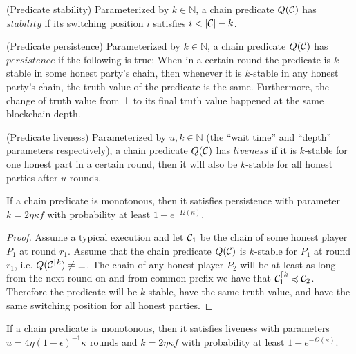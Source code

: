 \documentclass[11pt]{llncs}
\begin{document}
\begin{definition}{(Predicate stability)}
    Parameterized by $k \in \mathbb{N}$, a chain predicate $Q(\mathcal{C})$ has
    $\textit{stability}$ if its switching position $i$ satisfies $i < |\mathcal{C}|
    - k$.
\end{definition}

\begin{definition}{(Predicate persistence)}
    Parameterized by $k \in \mathbb{N}$, a chain predicate $Q(\mathcal{C})$ has
    $\textit{persistence}$ if the following is true: When in a certain round
    the predicate is $k$-stable in some honest party's chain, then whenever it is
    $k$-stable in any honest party's chain, the truth value of the predicate is
    the same. Furthermore, the change of truth value from $\bot$ to its final
    truth value happened at the same blockchain depth.
\end{definition}

\begin{definition}{(Predicate liveness)}
    Parameterized by $u, k \in \mathbb{N}$ (the ``wait time'' and ``depth''
    parameters respectively), a chain predicate $Q(\mathcal{C})$ has
    $\textit{liveness}$ if it is $k$-stable for one honest part in a certain
    round, then it will also be $k$-stable for all honest parties after $u$ rounds.
\end{definition}

\begin{theorem}
    If a chain predicate is monotonous, then it satisfies persistence with
    parameter $k = 2\eta \kappa f$ with probability at least $1 -
    e^{-\Omega(\kappa)}$.
\end{theorem}

\begin{proof}
    Assume a typical execution and let $\mathcal{C}_1$ be the chain of some honest
    player $P_1$ at round $r_1$. Assume that the chain predicate $Q(\mathcal{C})$ is
    $k$-stable for $P_1$ at round $r_1$, i.e.  $Q(\mathcal{C}^{\lceil k}) \neq \bot$.
    The chain of any honest player $P_2$ will be at least as long from the next
    round on and from common prefix we have that $\mathcal{C}_1^{\lceil k}
    \preccurlyeq \mathcal{C}_2$. Therefore the predicate will be $k$-stable, have
    the same truth value, and have the same switching position for all honest
    parties.
\end{proof}

\begin{theorem}
    If a chain predicate is monotonous, then it satisfies liveness with
    parameters $u = 4\eta(1 - \epsilon)^{-1}\kappa$ rounds and $k = 2\eta
    \kappa f$ with probability at least $1 - e^{-\Omega(\kappa)}$.
\end{theorem}
\end{document}
